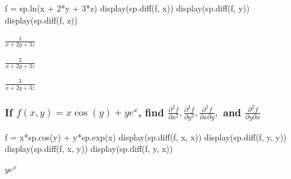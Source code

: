 \documentclass[
  letterpaper,
  DIV=11,
  numbers=noendperiod]{scrartcl}
\newenvironment{Shaded}{\begin{snugshade}}{\end{snugshade}}
\newcommand{\DecValTok}[1]{\textcolor[rgb]{0.68,0.00,0.00}{#1}}
\newcommand{\NormalTok}[1]{\textcolor[rgb]{0.00,0.23,0.31}{#1}}
\newcommand{\OperatorTok}[1]{\textcolor[rgb]{0.37,0.37,0.37}{#1}}
\begin{document}
\begin{Shaded}
\begin{Highlighting}[numbers=left,,]
\NormalTok{f }\OperatorTok{=}\NormalTok{ sp.ln(x }\OperatorTok{+} \DecValTok{2}\OperatorTok{*}\NormalTok{y }\OperatorTok{+} \DecValTok{3}\OperatorTok{*}\NormalTok{z)}
\NormalTok{display(sp.diff(f, x))}
\NormalTok{display(sp.diff(f, y))}
\NormalTok{display(sp.diff(f, z))}
\end{Highlighting}
\end{Shaded}

$\displaystyle \frac{1}{x + 2 y + 3 z}$

$\displaystyle \frac{2}{x + 2 y + 3 z}$

$\displaystyle \frac{3}{x + 2 y + 3 z}$

\hypertarget{if-fxy-xcosyyex-find-fracpartial2-fpartial-x2-fracpartial2-fpartial-y2-fracpartial2-fpartial-x-partial-y-and-fracpartial2-fpartial-y-partial-x}{%
\subsubsection{\texorpdfstring{If \(f(x,y) = x\cos(y)+ye^x\), find
\(\frac{\partial^2 f}{\partial x^2}, \frac{\partial^2 f}{\partial y^2}, \frac{\partial^2 f}{\partial x \partial y},\)
and
\(\frac{\partial^2 f}{\partial y \partial x}\)}{If f(x,y) = x\textbackslash cos(y)+ye\^{}x, find \textbackslash frac\{\textbackslash partial\^{}2 f\}\{\textbackslash partial x\^{}2\}, \textbackslash frac\{\textbackslash partial\^{}2 f\}\{\textbackslash partial y\^{}2\}, \textbackslash frac\{\textbackslash partial\^{}2 f\}\{\textbackslash partial x \textbackslash partial y\}, and \textbackslash frac\{\textbackslash partial\^{}2 f\}\{\textbackslash partial y \textbackslash partial x\}}}\label{if-fxy-xcosyyex-find-fracpartial2-fpartial-x2-fracpartial2-fpartial-y2-fracpartial2-fpartial-x-partial-y-and-fracpartial2-fpartial-y-partial-x}}

\begin{Shaded}
\begin{Highlighting}[numbers=left,,]
\NormalTok{f }\OperatorTok{=}\NormalTok{ x}\OperatorTok{*}\NormalTok{sp.cos(y) }\OperatorTok{+}\NormalTok{ y}\OperatorTok{*}\NormalTok{sp.exp(x)}
\NormalTok{display(sp.diff(f, x, x))}
\NormalTok{display(sp.diff(f, y, y))}
\NormalTok{display(sp.diff(f, x, y))}
\NormalTok{display(sp.diff(f, y, x))}
\end{Highlighting}
\end{Shaded}

$\displaystyle y e^{x}$
\end{document}
